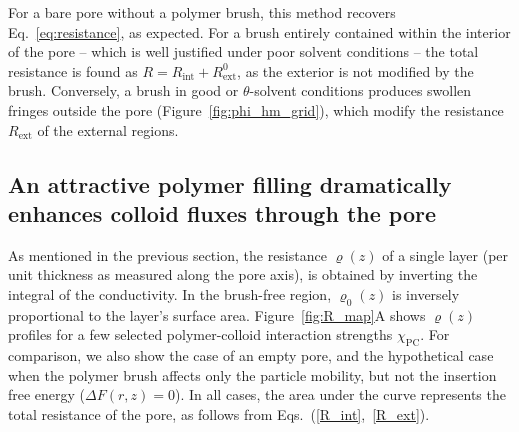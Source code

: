 \documentclass[12pt, a4paper]{article}
\begin{document}
For a bare pore without a polymer brush, this method recovers Eq.~\ref{eq:resistance}, as expected.
For a brush entirely contained within the interior of the pore -- which is well justified under poor solvent conditions -- the total resistance is found as $R = R_{\text{int}} + R_{\text{ext}}^{0}$, as the exterior is not modified by the brush.
Conversely, a brush in good or $\theta$-solvent conditions produces swollen fringes outside the pore (Figure~\ref{fig:phi_hm_grid}), which modify the resistance $R_{\text{ext}}$ of the external regions.




\subsection{An attractive polymer filling dramatically enhances colloid fluxes through the pore}

As mentioned in the previous section, the resistance $\varrho(z)$ of a single layer (per unit thickness as measured along the pore axis), is obtained by inverting the integral of the conductivity.
In the brush-free region, $\varrho_{0}(z)$ is inversely proportional to the layer's surface area.
Figure~\ref{fig:R_map}A shows $\varrho(z)$ profiles for a few selected polymer-colloid interaction strengths $\chi_{\text{PC}}$.
For comparison, we also show the case of an empty pore, and the hypothetical case when the polymer brush affects only the particle mobility, but not the insertion free energy ($\Delta F(r,z) = 0$).
In all cases, the area under the curve represents the total resistance of the pore, as follows from Eqs.~(\ref{R_int},~\ref{R_ext}).
\end{document}
